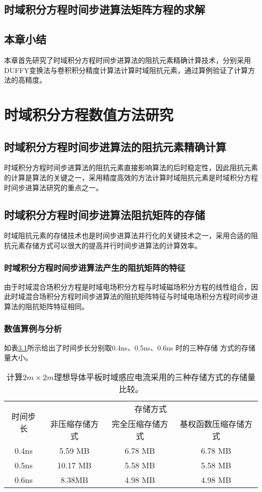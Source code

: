 \documentclass[master]{thesis-uestc}
\begin{document}
\section{时域积分方程时间步进算法矩阵方程的求解}

\section{本章小结}
本章首先研究了时域积分方程时间步进算法的阻抗元素精确计算技术，分别采用DUFFY变换法与卷积积分精度计算法计算时域阻抗元素，通过算例验证了计算方法的高精度。

\chapter{时域积分方程数值方法研究}
\section{时域积分方程时间步进算法的阻抗元素精确计算}
时域积分方程时间步进算法的阻抗元素直接影响算法的后时稳定性，因此阻抗元素的计算是算法的关键之一，采用精度高效的方法计算时域阻抗元素是时域积分方程时间步进算法研究的重点之一。

\section{时域积分方程时间步进算法阻抗矩阵的存储}
时域阻抗元素的存储技术也是时间步进算法并行化的关键技术之一，采用合适的阻抗元素存储方式可以很大的提高并行时间步进算法的计算效率。

\subsection{时域积分方程时间步进算法产生的阻抗矩阵的特征}
由于时域混合场积分方程是时域电场积分方程与时域磁场积分方程的线性组合，因此时域混合场积分方程时间步进算法的阻抗矩阵特征与时域电场积分方程时间步进算法的阻抗矩阵特征相同。

\subsection{数值算例与分析}
如表\ref{tablea}所示给出了时间步长分别取0.4ns、0.5ns、0.6ns 时的三种存储
方式的存储量大小。

\begin{table}[h]
\caption{计算$2m\times 2m$理想导体平板时域感应电流采用的三种存储方式的存储量比较。}
\begin{tabular}{cccc}
\toprule
\multirow{2}{*}{时间步长} & \multicolumn{3}{c}{存储方式} \\
\cmidrule{2-4}
& 非压缩存储方式 & 完全压缩存储方式 & 基权函数压缩存储方式 \\
\midrule
0.4ns & 5.59 MB & 6.78 MB & 6.78 MB\\
0.5ns & 10.17 MB & 5.58 MB & 5.58 MB \\
0.6ns & 8.38MB & 4.98 MB & 4.98 MB \\
\bottomrule
\end{tabular}
\label{tablea}
\end{table}
\end{document}
